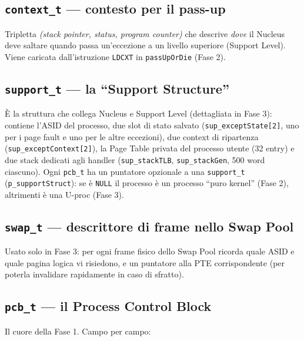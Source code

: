 \documentclass[11pt,a4paper]{article}
\newcommand{\code}[1]{\texttt{#1}}
\begin{document}
\subsection{\code{context\_t} --- contesto per il pass-up}
Tripletta \emph{(stack pointer, status, program counter)} che descrive
\emph{dove} il Nucleus deve saltare quando passa un'eccezione a un livello
superiore (Support Level). Viene caricata dall'istruzione \code{LDCXT} in
\code{passUpOrDie} (Fase 2).

\subsection{\code{support\_t} --- la ``Support Structure''}
È la struttura che collega Nucleus e Support Level (dettagliata in Fase 3):
contiene l'ASID del processo, due slot di stato salvato
(\code{sup\_exceptState[2]}, uno per i page fault e uno per le altre
eccezioni), due context di ripartenza (\code{sup\_exceptContext[2]}), la
Page Table privata del processo utente (32 entry) e due stack dedicati agli
handler (\code{sup\_stackTLB}, \code{sup\_stackGen}, 500 word ciascuno). Ogni
\code{pcb\_t} ha un puntatore opzionale a una \code{support\_t}
(\code{p\_supportStruct}): se è \code{NULL} il processo è un processo
``puro kernel'' (Fase 2), altrimenti è una U-proc (Fase 3).

\subsection{\code{swap\_t} --- descrittore di frame nello Swap Pool}
Usato solo in Fase 3: per ogni frame fisico dello Swap Pool ricorda quale
ASID e quale pagina logica vi risiedono, e un puntatore alla PTE
corrispondente (per poterla invalidare rapidamente in caso di sfratto).

\subsection{\code{pcb\_t} --- il Process Control Block}
\label{sub:pcb-t-fase1}
Il cuore della Fase 1. Campo per campo:
\end{document}
